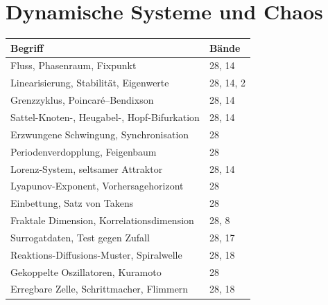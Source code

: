 \section*{Dynamische Systeme und Chaos}
\nopagebreak
{\small\renewcommand{\arraystretch}{1.32}
\begin{longtable}{@{}P{5.6cm}P{2.8cm}@{}}
\toprule
\textbf{Begriff} & \textbf{Bände}\\
\midrule
\endhead
Fluss, Phasenraum, Fixpunkt & 28, 14\\
Linearisierung, Stabilität, Eigenwerte & 28, 14, 2\\
Grenzzyklus, Poincaré--Bendixson & 28, 14\\
Sattel-Knoten-, Heugabel-, Hopf-Bifurkation & 28, 14\\
Erzwungene Schwingung, Synchronisation & 28\\
Periodenverdopplung, Feigenbaum & 28\\
Lorenz-System, seltsamer Attraktor & 28, 14\\
Lyapunov-Exponent, Vorhersagehorizont & 28\\
Einbettung, Satz von Takens & 28\\
Fraktale Dimension, Korrelationsdimension & 28, 8\\
Surrogatdaten, Test gegen Zufall & 28, 17\\
Reaktions-Diffusions-Muster, Spiralwelle & 28, 18\\
Gekoppelte Oszillatoren, Kuramoto & 28\\
Erregbare Zelle, Schrittmacher, Flimmern & 28, 18\\
\bottomrule
\end{longtable}}

